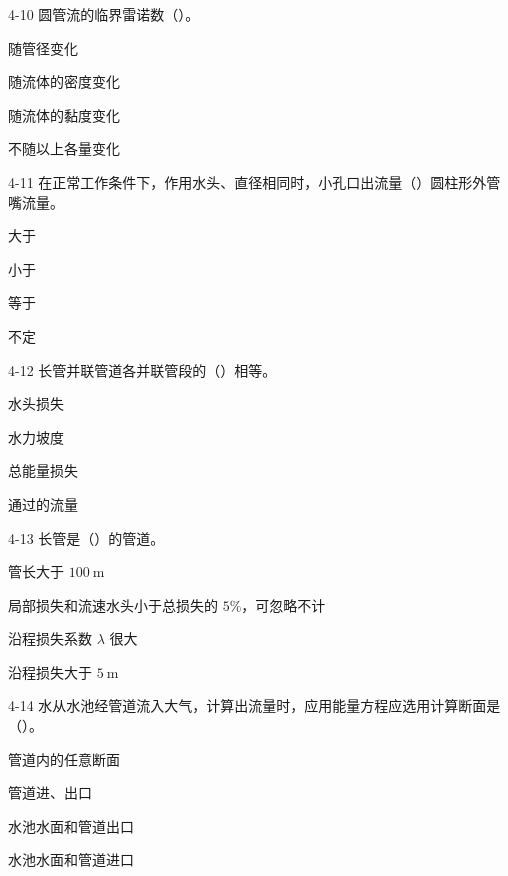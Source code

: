 \begin{ti}
\item[4-10] 圆管流的临界雷诺数（\quad）。
\begin{choices}
\item 随管径变化
\item 随流体的密度变化
\item 随流体的黏度变化
\item 不随以上各量变化
\end{choices}

\item[4-11] 在正常工作条件下，作用水头、直径相同时，小孔口出流量（\quad）圆柱形外管嘴流量。
\begin{choices}
\item 大于
\item 小于
\item 等于
\item 不定
\end{choices}

\item[4-12] 长管并联管道各并联管段的（\quad）相等。
\begin{choices}
\item 水头损失
\item 水力坡度
\item 总能量损失
\item 通过的流量
\end{choices}

\item[4-13] 长管是（\quad）的管道。
\begin{choices}
\item 管长大于 $100\ \mathrm{m}$
\item 局部损失和流速水头小于总损失的 $5\%$，可忽略不计
\item 沿程损失系数 $\lambda$ 很大
\item 沿程损失大于 $5\ \mathrm{m}$
\end{choices}

\item[4-14] 水从水池经管道流入大气，计算出流量时，应用能量方程应选用计算断面是（\quad）。
\begin{choices}
\item 管道内的任意断面
\item 管道进、出口
\item 水池水面和管道出口
\item 水池水面和管道进口
\end{choices}


\end{ti}
